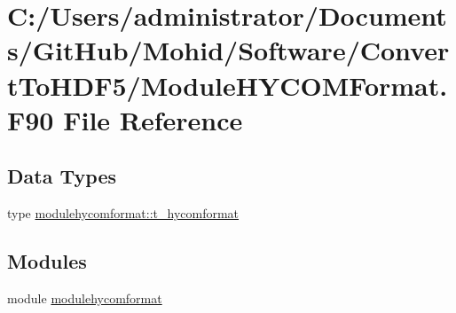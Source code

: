 \hypertarget{_module_h_y_c_o_m_format_8_f90}{}\section{C\+:/\+Users/administrator/\+Documents/\+Git\+Hub/\+Mohid/\+Software/\+Convert\+To\+H\+D\+F5/\+Module\+H\+Y\+C\+O\+M\+Format.F90 File Reference}
\label{_module_h_y_c_o_m_format_8_f90}
\subsection*{Data Types}
\begin{DoxyCompactItemize}
\item 
type \mbox{\hyperlink{structmodulehycomformat_1_1t__hycomformat}{modulehycomformat\+::t\+\_\+hycomformat}}
\end{DoxyCompactItemize}
\subsection*{Modules}
\begin{DoxyCompactItemize}
\item 
module \mbox{\hyperlink{namespacemodulehycomformat}{modulehycomformat}}
\end{DoxyCompactItemize}
